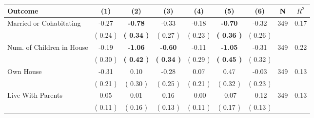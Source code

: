 \begin{tabular}{lcccccccc}
\toprule
 \textbf{Outcome} & \textbf{(1)} & \textbf{(2)} & \textbf{(3)} & \textbf{(4)} & \textbf{(5)} & \textbf{(6)} & \textbf{N} & \textbf{$ R^2$} \\
\midrule
Married or Cohabitating &     -0.27 & \textbf{    -0.78} &     -0.33 &     -0.18 & \textbf{    -0.70} &     -0.32 & 349 &       0.17 \\ 
 & (     0.24 ) & \textbf{(     0.34 )} & (     0.27 ) & (     0.23 ) & \textbf{(     0.36 )} & (     0.26 ) & \\
Num. of Children in House &     -0.19 & \textbf{    -1.06} & \textbf{    -0.60} &     -0.11 & \textbf{    -1.05} &     -0.31 & 349 &       0.22 \\ 
 & (     0.30 ) & \textbf{(     0.42 )} & \textbf{(     0.34 )} & (     0.29 ) & \textbf{(     0.45 )} & (     0.32 ) & \\
Own House &     -0.31 &      0.10 &     -0.28 &      0.07 &      0.47 &     -0.03 & 349 &       0.13 \\ 
 & (     0.21 ) & (     0.30 ) & (     0.25 ) & (     0.21 ) & (     0.32 ) & (     0.23 ) & \\
Live With Parents &      0.05 &      0.01 &      0.16 &     -0.00 &     -0.07 &     -0.12 & 349 &       0.13 \\ 
 & (     0.11 ) & (     0.16 ) & (     0.13 ) & (     0.11 ) & (     0.17 ) & (     0.13 ) & \\
\bottomrule
\end{tabular}
